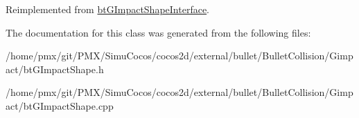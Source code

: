 Reimplemented from \hyperlink{classbtGImpactShapeInterface_adec0bd43cd0105b1d0dc172bc7db50d8}{bt\+G\+Impact\+Shape\+Interface}.



The documentation for this class was generated from the following files\+:\begin{DoxyCompactItemize}
\item 
/home/pmx/git/\+P\+M\+X/\+Simu\+Cocos/cocos2d/external/bullet/\+Bullet\+Collision/\+Gimpact/bt\+G\+Impact\+Shape.\+h\item 
/home/pmx/git/\+P\+M\+X/\+Simu\+Cocos/cocos2d/external/bullet/\+Bullet\+Collision/\+Gimpact/bt\+G\+Impact\+Shape.\+cpp\end{DoxyCompactItemize}
